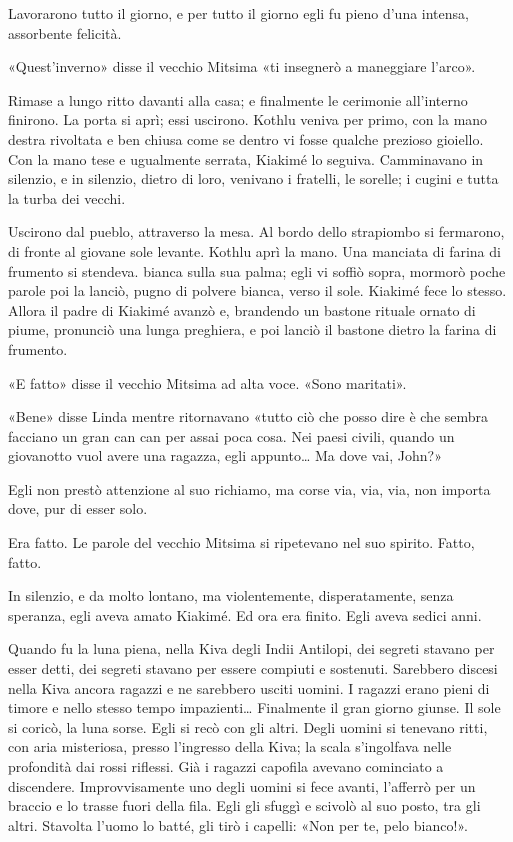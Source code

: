 \documentclass[
a5paper, %
10pt, %
twoside, 
onecolumn, %
openany, %
]{memoir}
\begin{document}
Lavorarono tutto il giorno, e per tutto il giorno egli fu pieno d’una intensa, assorbente felicità.

«Quest’inverno» disse il vecchio Mitsima «ti insegnerò a maneggiare l’arco».

Rimase a lungo ritto davanti alla casa; e finalmente le cerimonie all’interno finirono. La porta si aprì; essi uscirono. Kothlu veniva per primo, con la mano destra rivoltata e ben chiusa come se dentro vi fosse qualche prezioso gioiello. Con la mano tese e ugualmente serrata, Kiakimé lo seguiva. Camminavano in silenzio, e in silenzio, dietro di loro, venivano i fratelli, le sorelle; i cugini e tutta la turba dei vecchi.

Uscirono dal pueblo, attraverso la mesa. Al bordo dello strapiombo si fermarono, di fronte al giovane sole levante. Kothlu aprì la mano. Una manciata di farina di frumento si stendeva. bianca sulla sua palma; egli vi soffiò sopra, mormorò poche parole poi la lanciò, pugno di polvere bianca, verso il sole. Kiakimé fece lo stesso. Allora il padre di Kiakimé avanzò e, brandendo un bastone rituale ornato di piume, pronunciò una lunga preghiera, e poi lanciò il bastone dietro la farina di frumento.

«E fatto» disse il vecchio Mitsima ad alta voce. «Sono maritati».

«Bene» disse Linda mentre ritornavano «tutto ciò che posso dire è che sembra facciano un gran can can per assai poca cosa. Nei paesi civili, quando un giovanotto vuol avere una ragazza, egli appunto… Ma dove vai, John?»

Egli non prestò attenzione al suo richiamo, ma corse via, via, via, non importa dove, pur di esser solo.

Era fatto. Le parole del vecchio Mitsima si ripetevano nel suo spirito. Fatto, fatto.

In silenzio, e da molto lontano, ma violentemente, disperatamente, senza speranza, egli aveva amato Kiakimé. Ed ora era finito. Egli aveva sedici anni.

Quando fu la luna piena, nella Kiva degli Indii Antilopi, dei segreti stavano per esser detti, dei segreti stavano per essere compiuti e sostenuti. Sarebbero discesi nella Kiva ancora ragazzi e ne sarebbero usciti uomini. I ragazzi erano pieni di timore e nello stesso tempo impazienti… Finalmente il gran giorno giunse. Il sole si coricò, la luna sorse. Egli si recò con gli altri. Degli uomini si tenevano ritti, con aria misteriosa, presso l’ingresso della Kiva; la scala s’ingolfava nelle profondità dai rossi riflessi. Già i ragazzi capofila avevano cominciato a discendere. Improvvisamente uno degli uomini si fece avanti, l’afferrò per un braccio e lo trasse fuori della fila. Egli gli sfuggì e scivolò al suo posto, tra gli altri. Stavolta l’uomo lo batté, gli tirò i capelli: «Non per te, pelo bianco!».
\end{document}
